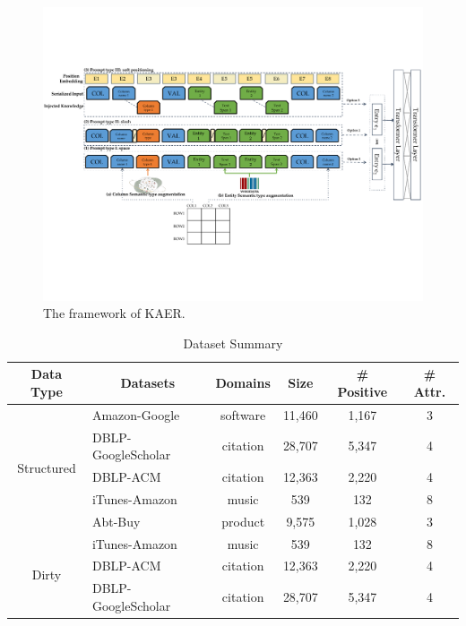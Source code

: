 \begin{figure}[!ht]
    \centering
    \includegraphics[width=\linewidth]{plots/DCER-crop-version1.pdf}
    \caption{The framework of KAER.}
    \label{fig:framework}
\end{figure}


\begin{table}[]
\centering
\begin{tabular}{@{}clcccc@{}}
\toprule
\textbf{Data Type} & \multicolumn{1}{c}{\textbf{Datasets}} & \textbf{Domains} & \textbf{Size} & \textbf{\# Positive} & \textbf{\# Attr.} \\ \midrule
\multirow{5}{*}{Structured} & Amazon-Google      & software & 11,460 & 1,167 & 3 \\
                            & DBLP-GoogleScholar & citation & 28,707 & 5,347 & 4 \\
                            & DBLP-ACM           & citation & 12,363 & 2,220 & 4 \\
                            & iTunes-Amazon      & music    & 539    & 132   & 8 \\
                            & Abt-Buy            & product  & 9,575  & 1,028 & 3 \\ \midrule
\multirow{3}{*}{Dirty}      & iTunes-Amazon      & music    & 539    & 132   & 8 \\
                            & DBLP-ACM           & citation & 12,363 & 2,220 & 4 \\
                            & DBLP-GoogleScholar & citation & 28,707 & 5,347 & 4 \\ \bottomrule
\end{tabular}
\caption{Dataset Summary}
\label{tab:dataset_overview}
\end{table}



